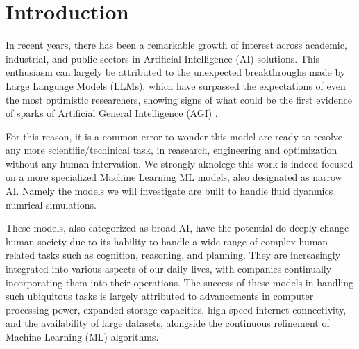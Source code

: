 

\chapter{Introduction}
\label{chap:Introduction}

In recent years, there has been a remarkable growth of interest across academic, industrial, and public sectors in Artificial Intelligence (AI) solutions. This enthusiasm can largely be attributed to the unexpected breakthroughs made by Large Language Models (LLMs), which have surpassed the expectations of even the most optimistic researchers, showing signs of what could be the first evidence of sparks of Artificial General Intelligence (AGI) \citep{Bubeck2023}.

For this reason, it is a common error to wonder this model are ready to resolve any more scientific/techinical task, in reasearch, engineering and optimization without any human intervation. We strongly aknolege this work is indeed focused on a more specialized Machine Learning ML models, also designated as narrow AI. Namely the models we will investigate are built to handle fluid dyanmics numrical simulations.

These models, also categorized as broad AI, have the potential do deeply change human society due to its hability to handle a wide range of complex human related tasks such as cognition, reasoning, and planning. They are increasingly integrated into various aspects of our daily lives, with companies continually incorporating them into their operations. The success of these models in handling such ubiquitous tasks is largely attributed to advancements in computer processing power, expanded storage capacities, high-speed internet connectivity, and the availability of large datasets, alongside the continuous refinement of Machine Learning (ML)  algorithms.

